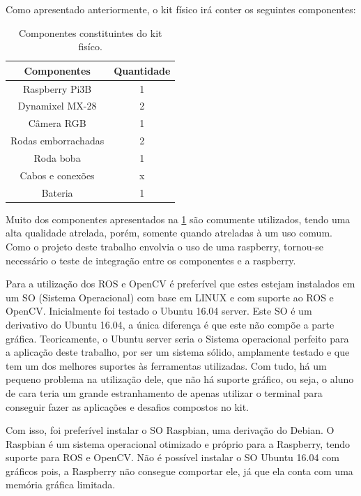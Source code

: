 Como apresentado anteriormente, o kit físico irá conter os seguintes componentes:
\begin{table}
	\centering
	\begin{small}
		\caption{Componentes constituintes do kit fisíco.} \label{Tabela1}
		\begin{tabular}{cc}
			\hline
			Componentes              & Quantidade\\
			\hline
			Raspberry Pi3B              & 1 \\
			Dynamixel MX-28                & 2 \\
			Câmera RGB                    & 1 \\
			Rodas emborrachadas            & 2 \\
			Roda boba                    & 1 \\
			Cabos e conexões            & x \\
			Bateria                     & 1 \\
			\hline
		\end{tabular}
	\end{small}
\end{table}

Muito dos componentes apresentados na \ref{Tabela1} são comumente utilizados, tendo uma alta qualidade atrelada, porém, somente quando atreladas à um uso comum. Como o projeto deste trabalho envolvia o uso de uma raspberry, tornou-se necessário o teste de integração entre os componentes e a raspberry.

Para a utilização dos ROS e OpenCV é preferível que estes estejam instalados em um SO (Sistema Operacional) com base em LINUX e com suporte ao ROS e OpenCV. Inicialmente foi testado o Ubuntu 16.04 server. Este SO é um derivativo do Ubuntu 16.04, a única diferença é que este não compõe a parte gráfica. Teoricamente, o Ubuntu server seria o Sistema operacional perfeito para a aplicação deste trabalho, por ser um sistema sólido, amplamente testado e que tem um dos melhores suportes às ferramentas utilizadas. Com tudo, há um pequeno problema na utilização dele, que não há suporte gráfico, ou seja, o aluno de cara teria um grande estranhamento de apenas utilizar o terminal para conseguir fazer as aplicações e desafios compostos no kit.

Com isso, foi preferível instalar o SO Raspbian, uma derivação do Debian. O Raspbian é um sistema operacional otimizado e próprio para a Raspberry, tendo suporte para ROS e OpenCV. Não é possível instalar o SO Ubuntu 16.04 com gráficos pois, a Raspberry não consegue comportar ele, já que ela conta com uma memória gráfica limitada.

